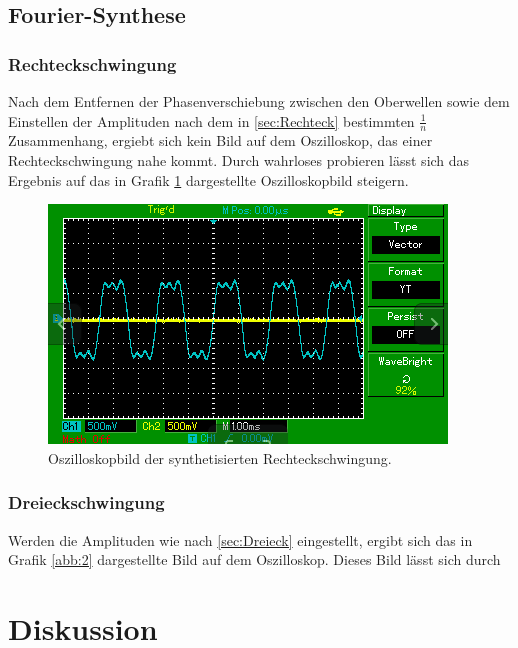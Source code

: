 \subsection{Fourier-Synthese}
\subsubsection{Rechteckschwingung}
Nach dem Entfernen der Phasenverschiebung zwischen den Oberwellen sowie dem Einstellen
der Amplituden nach dem in \ref{sec:Rechteck} bestimmten $\frac{1}{n}$ Zusammenhang,
ergiebt sich kein Bild auf dem Oszilloskop, das einer Rechteckschwingung nahe kommt.
Durch wahrloses probieren lässt sich das Ergebnis auf das in Grafik \ref{abb:1} dargestellte
Oszilloskopbild steigern.
\begin{figure}
  \centering
  \includegraphics[scale=0.4]{Rechteck.png}
  \caption{Oszilloskopbild der synthetisierten Rechteckschwingung.}
  \label{abb:1}
\end{figure}
\subsubsection{Dreieckschwingung}
Werden die Amplituden wie nach \ref{sec:Dreieck} eingestellt, ergibt sich das in
Grafik \ref{abb:2} dargestellte Bild auf dem Oszilloskop. Dieses Bild lässt sich durch


\section{Diskussion}
\newpage
\nocite{*}
\printbibliography
